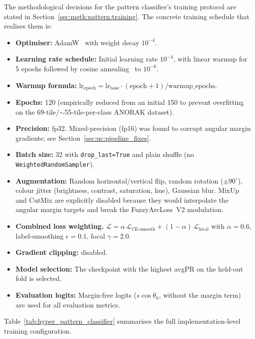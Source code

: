 The methodological decisions for the pattern classifier's training
protocol are stated in Section~\ref{sec:meth:pattern:training}.
The concrete training schedule that realises them is:
\begin{itemize}
    \item \textbf{Optimiser:} AdamW~\cite{loshchilov2019adamw} with
    weight decay $10^{-4}$.
    \item \textbf{Learning rate schedule:} Initial learning rate
    $10^{-4}$, with linear warmup for 5 epochs followed by cosine
    annealing~\cite{loshchilov2017sgdr} to $10^{-6}$.
    \item \textbf{Warmup formula:}
    $\text{lr}_{\text{epoch}} = \text{lr}_{\text{base}}
    \cdot (\text{epoch} + 1) / \text{warmup\_epochs}$.
    \item \textbf{Epochs:} 120 (empirically reduced from an initial
    150 to prevent overfitting on the 69-tile/$\sim$55-tile-per-class
    ANORAK dataset).
    \item \textbf{Precision:} fp32. Mixed-precision (fp16) was found
    to corrupt angular margin gradients; see
    Section~\ref{sec:uc:pipeline_fixes}.
    \item \textbf{Batch size:} 32 with \texttt{drop\_last=True} and
    plain shuffle (no \texttt{WeightedRandomSampler}).
    \item \textbf{Augmentation:} Random horizontal/vertical flip,
    random rotation ($\pm 90^{\circ}$), colour jitter (brightness,
    contrast, saturation, hue), Gaussian blur. MixUp and CutMix are
    explicitly disabled because they would interpolate the angular
    margin targets and break the FuzzyArcLoss~V2 modulation.
    \item \textbf{Combined loss weighting.}
    $\mathcal{L} = \alpha\,\mathcal{L}_{\text{CE-smooth}} + (1-\alpha)\,
    \mathcal{L}_{\text{focal}}$ with $\alpha = 0.6$,
    label-smoothing $\epsilon = 0.1$, focal $\gamma = 2.0$.
    \item \textbf{Gradient clipping:} disabled.
    \item \textbf{Model selection:} The checkpoint with the highest
    avgPR on the held-out fold is selected.
    \item \textbf{Evaluation logits:} Margin-free logits
    ($s\cos\theta_k$, without the margin term) are used for all
    evaluation metrics.
\end{itemize}

Table~\ref{tab:hyper_pattern_classifier} summarises the full
implementation-level training configuration.

